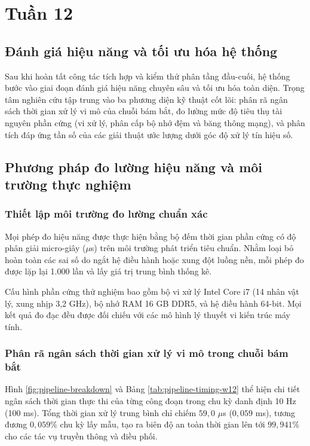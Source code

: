 \section{Tuần 12}

\subsection{Đánh giá hiệu năng và tối ưu hóa hệ thống}

\hspace{0.5cm} Sau khi hoàn tất công tác tích hợp và kiểm thử phân tầng đầu-cuối, hệ thống bước vào giai đoạn đánh giá hiệu năng chuyên sâu và tối ưu hóa toàn diện. Trọng tâm nghiên cứu tập trung vào ba phương diện kỹ thuật cốt lõi: phân rã ngân sách thời gian xử lý vi mô của chuỗi bám bắt, đo lường mức độ tiêu thụ tài nguyên phần cứng (vi xử lý, phân cấp bộ nhớ đệm và băng thông mạng), và phân tích đáp ứng tần số của các giải thuật ước lượng dưới góc độ xử lý tín hiệu số.

\subsection{Phương pháp đo lường hiệu năng và môi trường thực nghiệm}

\subsubsection{Thiết lập môi trường đo lường chuẩn xác}

\hspace{0.5cm} Mọi phép đo hiệu năng được thực hiện bằng bộ đếm thời gian phần cứng có độ phân giải micro-giây ($\mu$s) trên môi trường phát triển tiêu chuẩn. Nhằm loại bỏ hoàn toàn các sai số do ngắt hệ điều hành hoặc xung đột luồng nền, mỗi phép đo được lặp lại 1.000 lần và lấy giá trị trung bình thống kê.

Cấu hình phần cứng thử nghiệm bao gồm bộ vi xử lý Intel Core i7 (14 nhân vật lý, xung nhịp 3,2 GHz), bộ nhớ RAM 16 GB DDR5, và hệ điều hành 64-bit. Mọi kết quả đo đạc đều được đối chiếu với các mô hình lý thuyết vi kiến trúc máy tính.

\subsubsection{Phân rã ngân sách thời gian xử lý vi mô trong chuỗi bám bắt}

\hspace{0.5cm} Hình \ref{fig:pipeline-breakdown} và Bảng \ref{tab:pipeline-timing-w12} thể hiện chi tiết ngân sách thời gian thực thi của từng công đoạn trong chu kỳ danh định 10 Hz (100 ms). Tổng thời gian xử lý trung bình chỉ chiếm $59{,}0$ $\mu$s ($0{,}059$ ms), tương đương $0{,}059\%$ chu kỳ lấy mẫu, tạo ra biên độ an toàn thời gian lên tới $99{,}941\%$ cho các tác vụ truyền thông và điều phối.

